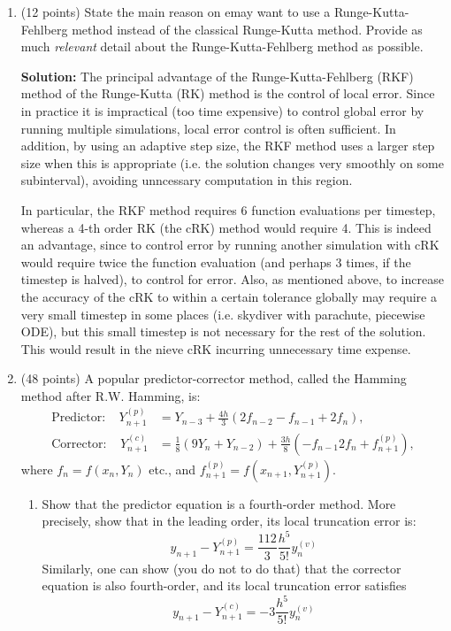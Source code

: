 \documentclass[11pt]{article}
\def\f{\frac }
\begin{document}
\begin{enumerate}
\item (12 points) State the main reason on emay want to use a Runge-Kutta-Fehlberg method instead of the classical Runge-Kutta method.
Provide as much {\em relevant} detail about the Runge-Kutta-Fehlberg method as possible.

\bigskip
\textbf{Solution:} The principal advantage of the Runge-Kutta-Fehlberg (RKF) method of the Runge-Kutta (RK) method is the control of local error.
Since in practice it is impractical (too time expensive) to control global error by running multiple simulations, local error control is often sufficient.
In addition, by using an adaptive step size, the RKF method uses a larger step size when this is appropriate (i.e. the solution changes very smoothly on some subinterval), avoiding unncessary computation in this region.

In particular, the RKF method requires 6 function evaluations per timestep, whereas a 4-th order RK (the cRK) method would require 4.
This is indeed an advantage, since to control error by running another simulation with cRK would require twice the function evaluation (and perhaps 3 times, if the timestep is halved), to control for error.
Also, as mentioned above, to increase the accuracy of the cRK to within a certain tolerance globally may require a very small timestep in some places (i.e. skydiver with parachute, piecewise ODE), but this small timestep is not necessary for the rest of the solution.
This would result in the nieve cRK incurring unnecessary time expense.

\item (48 points) A popular predictor-corrector method, called the Hamming method after R.W. Hamming, is:
\begin{align} \text{Predictor:}~~~~~ Y_{n+1}^{(p)} &= Y_{n-3} + \f{4h}{3} \left ( 2f_{n-2} - f_{n-1} + 2f_n \right ) , \\
\text{Corrector:}~~~~~ Y_{n+1}^{(c)} &= \f{1}{8} \left ( 9 Y_{n} + Y_{n-2} \right)  + \f{3h}{8} \left ( -f_{n-1} 2f_n  + f_{n+1} ^{(p)}\right ) , \nonumber \end{align}
where $f_n = f(x_n ,Y_n) $ etc., and $f_{n+1} ^{(p)} = f\left (x_{n+1} , Y_{n+1}^{(p)}\right )$.
\begin{enumerate}
\item Show that the predictor equation is a fourth-order method.
More precisely, show that in the leading order, its local truncation error is:
\begin{equation} y_{n+1} - Y_{n+1} ^{(p)} = \f{112}{3} \f{h^5}{5!}y_n ^{(v)} \end{equation}
Similarly, one can show (you do not to do that) that the corrector equation is also fourth-order, and its local truncation error satisfies
\begin{equation} y_{n+1} - Y_{n+1} ^{(c)} = -3 \f{h^5}{5!}y_n ^{(v)} \end{equation}


\end{enumerate}
\end{enumerate}
\end{document}
